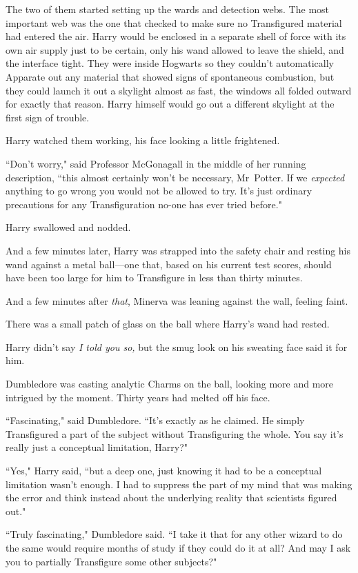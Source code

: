 The two of them started setting up the wards and detection webs. The most important web was the one that checked to make sure no Transfigured material had entered the air. Harry would be enclosed in a separate shell of force with its own air supply just to be certain, only his wand allowed to leave the shield, and the interface tight. They were inside Hogwarts so they couldn't automatically Apparate out any material that showed signs of spontaneous combustion, but they could launch it out a skylight almost as fast, the windows all folded outward for exactly that reason. Harry himself would go out a different skylight at the first sign of trouble.

Harry watched them working, his face looking a little frightened.

``Don't worry," said Professor McGonagall in the middle of her running description, ``this almost certainly won't be necessary, Mr~Potter. If we \emph{expected} anything to go wrong you would not be allowed to try. It's just ordinary precautions for any Transfiguration no-one has ever tried before."

Harry swallowed and nodded.

And a few minutes later, Harry was strapped into the safety chair and resting his wand against a metal ball—one that, based on his current test scores, should have been too large for him to Transfigure in less than thirty minutes.

And a few minutes after \emph{that}, Minerva was leaning against the wall, feeling faint.

There was a small patch of glass on the ball where Harry's wand had rested.

Harry didn't say \emph{I told you so,} but the smug look on his sweating face said it for him.

Dumbledore was casting analytic Charms on the ball, looking more and more intrigued by the moment. Thirty years had melted off his face.

``Fascinating," said Dumbledore. ``It's exactly as he claimed. He simply Transfigured a part of the subject without Transfiguring the whole. You say it's really just a conceptual limitation, Harry?"

``Yes," Harry said, ``but a deep one, just knowing it had to be a conceptual limitation wasn't enough. I had to suppress the part of my mind that was making the error and think instead about the underlying reality that scientists figured out."

``Truly fascinating," Dumbledore said. ``I take it that for any other wizard to do the same would require months of study if they could do it at all? And may I ask you to partially Transfigure some other subjects?"

